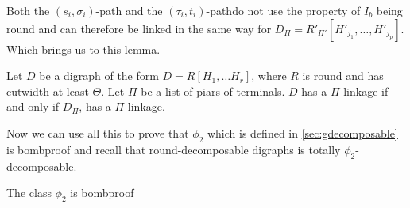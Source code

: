 Both the $(s_i, \sigma_i)$-path and the $(\tau_i,t_i)$-pathdo not use the property of $I_b$ being round and can therefore be linked in the same way for $D_\Pi=R'_{\Pi'}[H'_{j_1},\dots ,H'_{j_p}]$. 
Which brings us to this lemma.
\begin{lemma}
    Let $D$ be a digraph of the form $D=R[H_1,\dots H_r]$, where $R$ is round and has cutwidth at least $\Theta$. Let $\Pi$ be a list of piars of terminals. $D$ has a $\Pi$-linkage if and only if $D_\Pi$, has a $\Pi$-linkage.
    \label{lemma:compressiondecom}
\end{lemma}
Now we can use all this to prove that $\phi_2$ which is defined in \autoref{sec:gdecomposable} is bombproof and recall that round-decomposable digraphs is totally $\phi_2$-decomposable.
\begin{lemma}
    The class $\phi_2$ is bombproof
\end{lemma}
